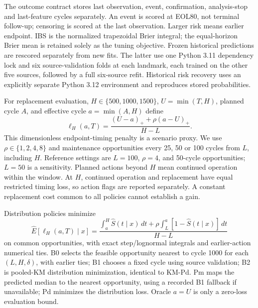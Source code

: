 \documentclass[preprint,12pt]{elsarticle}
\begin{document}
The outcome contract stores last observation, event, confirmation, analysis-stop and last-feature cycles separately. An event is scored at EOL80, not terminal follow-up; censoring is scored at the last observation. Larger risk means earlier endpoint. IBS is the normalized trapezoidal Brier integral; the equal-horizon Brier mean is retained solely as the tuning objective. Frozen historical predictions are rescored separately from new fits. The latter use one Python 3.11 dependency lock and six source-validation folds at each landmark, each trained on the other five sources, followed by a full six-source refit. Historical risk recovery uses an explicitly separate Python 3.12 environment and reproduces stored probabilities.

For replacement evaluation, $H\in\{500,1000,1500\}$, $U=\min(T,H)$, planned cycle $A$, and effective cycle $a=\min(A,H)$ define
\begin{equation}\ell_H(a,T)=\frac{(U-a)_++\rho(a-U)_+}{H-L}.\label{eq:replacement}\end{equation}
This dimensionless endpoint-timing penalty is a scenario proxy. We use $\rho\in\{1,2,4,8\}$ and maintenance opportunities every 25, 50 or 100 cycles from $L$, including $H$. Reference settings are $L=100$, $\rho=4$, and 50-cycle opportunities; $L=50$ is a sensitivity. Planned actions beyond $H$ mean continued operation within the window. At $H$, continued operation and replacement have equal restricted timing loss, so action flags are reported separately. A constant replacement cost common to all policies cannot establish a gain.

Distribution policies minimize
\begin{equation}\widehat E[\ell_H(a,T)\mid x]=\frac{\int_a^H\widehat S(t\mid x)\,dt+\rho\int_L^a[1-\widehat S(t\mid x)]\,dt}{H-L}\end{equation}
on common opportunities, with exact step/lognormal integrals and earlier-action numerical ties. B0 selects the feasible opportunity nearest to cycle 1000 for each $(L,H,\delta)$, with earlier ties; B1 chooses a fixed cycle using source validation; B2 is pooled-KM distribution minimization, identical to KM-Pd. Pm maps the predicted median to the nearest opportunity, using a recorded B1 fallback if unavailable; Pd minimizes the distribution loss. Oracle $a=U$ is only a zero-loss evaluation bound.
\end{document}
